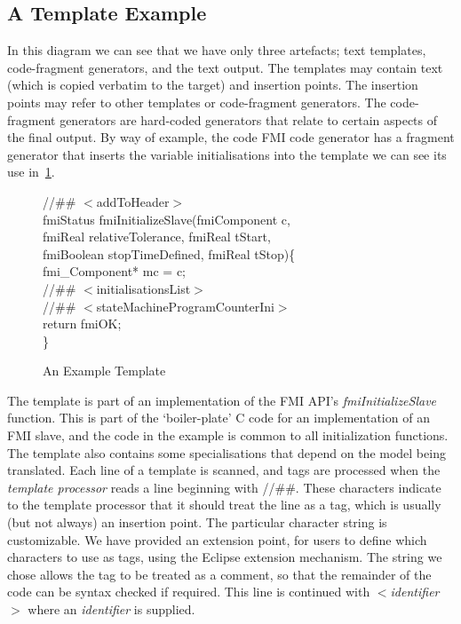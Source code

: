 \documentclass{llncs}%
\begin{document}
\subsection{A Template Example}
In this diagram we can see that we have only three artefacts; text templates, code-fragment generators, and the text output. The templates may contain text (which is copied verbatim to the target) and insertion points. The insertion points may refer to other templates or code-fragment generators. The code-fragment generators are hard-coded generators that relate to certain aspects of the final output. By way of example, the code FMI code generator has a fragment generator that inserts the variable initialisations into the template we can see its use in~\ref{fig:templateExample}. 
%
\begin{figure}
\begin{center}
\begin{minipage}{0.8\textwidth}
//\#\# $<$addToHeader$>$\\
fmiStatus fmiInitializeSlave(fmiComponent c,\\
\hspace*{0.2cm}fmiReal relativeTolerance, fmiReal tStart,\\
\hspace*{0.2cm}fmiBoolean stopTimeDefined, fmiReal tStop)\{\\
\hspace*{0.4cm}fmi\_Component* mc = c;\\
\hspace*{0.4cm}//\#\# $<$initialisationsList$>$\\
\hspace*{0.4cm}//\#\# $<$stateMachineProgramCounterIni$>$\\
\hspace*{0.4cm}return fmiOK;\\
\}
\end{minipage}
\end{center}
\caption{An Example Template}
\label{fig:templateExample}
\end{figure}
%
%
The template is part of an implementation of the FMI API's \emph{fmiInitializeSlave} function. This is part of the `boiler-plate' C code for an implementation of an FMI slave, and the code in the example is common to all initialization functions. The template also contains some specialisations that depend on the model being translated. Each line of a template is scanned, and tags are processed when the \emph{template processor} reads a line beginning with //\#\#.  These characters indicate to the template processor that it should treat the line as a tag, which is usually (but not always) an insertion point. The particular character string is customizable. We have provided an extension point, for users to define which characters to use as tags, using the Eclipse extension mechanism. The string we chose allows the tag to be treated as a comment, so that the remainder of the code can be syntax checked if required. This line is continued with $<$\emph{identifier}$>$ where an \emph{identifier} is supplied.
\end{document}
